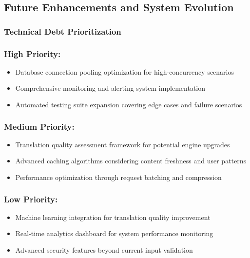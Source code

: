 \subsection{Future Enhancements and System Evolution}

\subsubsection{Technical Debt Prioritization}

\subsubsection{High Priority:}
\begin{itemize}
    \item Database connection pooling optimization for high-concurrency scenarios
    \item Comprehensive monitoring and alerting system implementation
    \item Automated testing suite expansion covering edge cases and failure scenarios
\end{itemize}

\subsubsection{Medium Priority:}
\begin{itemize}
    \item Translation quality assessment framework for potential engine upgrades
    \item Advanced caching algorithms considering content freshness and user patterns
    \item Performance optimization through request batching and compression
\end{itemize}

\subsubsection{Low Priority:}
\begin{itemize}
    \item Machine learning integration for translation quality improvement
    \item Real-time analytics dashboard for system performance monitoring
    \item Advanced security features beyond current input validation
\end{itemize}


